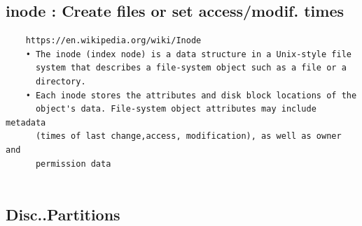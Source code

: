 \documentclass[a4paper,12pt]{article}
\begin{document}
\subsection{inode    : Create files or set access/modif. times}
\begin{verbatim}
    https://en.wikipedia.org/wiki/Inode
    • The inode (index node) is a data structure in a Unix-style file 			  
      system that describes a file-system object such as a file or a
      directory. 
    • Each inode stores the attributes and disk block locations of the
      object's data. File-system object attributes may include metadata 
      (times of last change,access, modification), as well as owner and
      permission data
           
\end{verbatim}




\subsection{Disc..Partitions }
\end{document}
